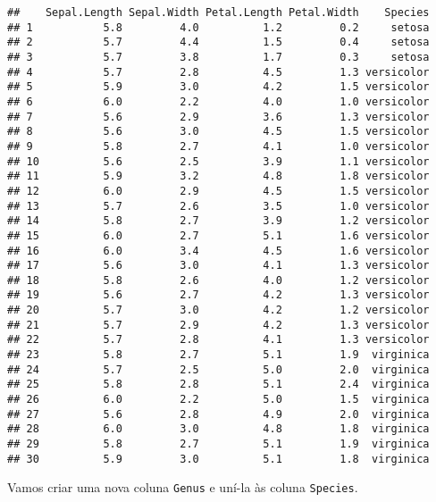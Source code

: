\documentclass[
]{book}
\newenvironment{Shaded}{\begin{snugshade}}{\end{snugshade}}
\newcommand{\DataTypeTok}[1]{\textcolor[rgb]{0.13,0.29,0.53}{#1}}
\newcommand{\KeywordTok}[1]{\textcolor[rgb]{0.13,0.29,0.53}{\textbf{#1}}}
\newcommand{\NormalTok}[1]{#1}
\newcommand{\OperatorTok}[1]{\textcolor[rgb]{0.81,0.36,0.00}{\textbf{#1}}}
\newcommand{\StringTok}[1]{\textcolor[rgb]{0.31,0.60,0.02}{#1}}
\begin{document}
\begin{verbatim}
##    Sepal.Length Sepal.Width Petal.Length Petal.Width    Species
## 1           5.8         4.0          1.2         0.2     setosa
## 2           5.7         4.4          1.5         0.4     setosa
## 3           5.7         3.8          1.7         0.3     setosa
## 4           5.7         2.8          4.5         1.3 versicolor
## 5           5.9         3.0          4.2         1.5 versicolor
## 6           6.0         2.2          4.0         1.0 versicolor
## 7           5.6         2.9          3.6         1.3 versicolor
## 8           5.6         3.0          4.5         1.5 versicolor
## 9           5.8         2.7          4.1         1.0 versicolor
## 10          5.6         2.5          3.9         1.1 versicolor
## 11          5.9         3.2          4.8         1.8 versicolor
## 12          6.0         2.9          4.5         1.5 versicolor
## 13          5.7         2.6          3.5         1.0 versicolor
## 14          5.8         2.7          3.9         1.2 versicolor
## 15          6.0         2.7          5.1         1.6 versicolor
## 16          6.0         3.4          4.5         1.6 versicolor
## 17          5.6         3.0          4.1         1.3 versicolor
## 18          5.8         2.6          4.0         1.2 versicolor
## 19          5.6         2.7          4.2         1.3 versicolor
## 20          5.7         3.0          4.2         1.2 versicolor
## 21          5.7         2.9          4.2         1.3 versicolor
## 22          5.7         2.8          4.1         1.3 versicolor
## 23          5.8         2.7          5.1         1.9  virginica
## 24          5.7         2.5          5.0         2.0  virginica
## 25          5.8         2.8          5.1         2.4  virginica
## 26          6.0         2.2          5.0         1.5  virginica
## 27          5.6         2.8          4.9         2.0  virginica
## 28          6.0         3.0          4.8         1.8  virginica
## 29          5.8         2.7          5.1         1.9  virginica
## 30          5.9         3.0          5.1         1.8  virginica
\end{verbatim}

Vamos criar uma nova coluna \texttt{Genus} e uní-la às coluna \texttt{Species}.

\begin{Shaded}
\end{Shaded}
\end{document}
